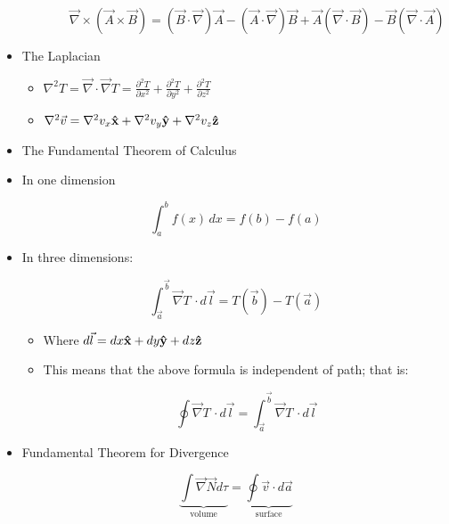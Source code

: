 \begin{itemize}
\begin{itemize}
\begin{itemize}
            $$\vec{\nabla}\times(\vec{A}\times\vec{B})=(\vec{B}\cdot\vec{\nabla})\vec{A}-(\vec{A}\cdot\vec{\nabla})\vec{B}+\vec{A}(\vec{\nabla}\cdot\vec{B})-\vec{B}(\vec{\nabla}\cdot\vec{A})$$

        \end{itemize}

    \end{itemize}

  \item The Laplacian

    \begin{itemize}

      \item $\nabla^2 T=\vec{\nabla}\cdot \vec{\nabla}T=\displaystyle \frac{\partial^2T}{\partial x^2}+\frac{\partial^2T}{\partial y^2}+\frac{\partial^2T}{\partial z^2}$

      \item $\nabla^2 \vec{v}=\nabla^2v_x\bold{\hat{x}}+\nabla^2v_y\bold{\hat{y}}+\nabla^2v_z\bold{\hat{z}}$

    \end{itemize}

  \item The Fundamental Theorem of Calculus

  \item In one dimension

    $$\int_a^b f(x)\,dx=f(b)-f(a)$$

  \item In three dimensions:

    $$\int_{\vec{a}}^{\vec{b}}\vec{\nabla}T\,\cdot d\vec{l}=T(\vec{b})-T(\vec{a})$$

    \begin{itemize}

      \item Where $d\vec{l}=dx\bold{\hat{x}}+dy\bold{\hat{y}}+dz\bold{\hat{z}}$

      \item This means that the above formula is independent of path; that is:

        $$\oint\vec{\nabla}T\,\cdot d\vec{l}=\int_{\vec{a}}^{\vec{b}}\vec{\nabla} T\,\cdot d\vec{l}$$

    \end{itemize}

  \item Fundamental Theorem for Divergence

    $$\underbrace{\int\vec{\nabla}\vec{N}d\tau}_{\text{volume}}=\underbrace{\oint\vec{v}\cdot d\vec{a}}_{\text{surface}}$$


\end{itemize}
